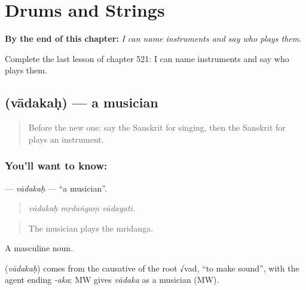 
\chapter{Drums and Strings}
\label{ch:sa-drums-and-strings}

\begin{chapteropening}
\textbf{By the end of this chapter:} \emph{I can name instruments and say who plays them.}

Complete the last lesson of chapter 521: I can name instruments and say who plays them.
\end{chapteropening}

\section[\texorpdfstring{\sk{वादकः} (vādakaḥ)}{वादकः (vādakaḥ)}]{ (vādakaḥ) — a musician}

\label{lesson:SA-C521-vadakah}



\begin{quote}
Before the new one: say the Sanskrit for singing, then the Sanskrit for plays an instrument.
\end{quote}

\subsection*{You'll want to know: }
\textbf{} — \emph{vādakaḥ} — \textquotedblleft{}a musician\textquotedblright{}.

\begin{quote}
  
\end{quote}

\begin{quote}
\emph{vādakaḥ mṛdaṅgaṃ vādayati.}
\end{quote}

\begin{quote}
The musician plays the mridanga.
\end{quote}

A masculine noun.

\begin{cousinweb}
\textbf{} (\emph{vādakaḥ}) comes from the causative of the root √vad, \textquotedblleft{}to make sound\textquotedblright{}, with the agent ending \emph{-aka}; MW gives \emph{vādaka} as a musician (MW).
\end{cousinweb}

